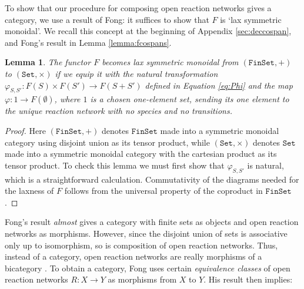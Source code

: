 \documentclass{compositionalityarticle}
\newcommand{\FinSet}{\mathtt{FinSet}}
\newcommand{\Set}{\mathtt{Set}}
\newcommand{\maps}{\colon}
\theoremstyle{plain}
\newtheorem{lem}[thm]{Lemma}
\theoremstyle{remark}
\begin{document}
To show that our procedure for composing open reaction networks gives a category, we use a result of Fong: it suffices to show that $F$ is `lax symmetric monoidal'.  We recall this concept at the beginning of Appendix \ref{sec:deccospan}, and Fong's result in Lemma \ref{lemma:fcospans}.

\begin{lem}
\label{lemma:RLax}
The functor $F$ becomes lax symmetric monoidal from $(\FinSet, +)$ to $(\Set, \times)$ if we equip it with the natural transformation $\varphi_{S,S'} \maps F(S) \times F(S') \to F(S + S')$ defined in Equation \eqref{eq:Phi} and the map $\varphi \maps 1 \to F(\emptyset)$, where $1$ is a chosen one-element set, sending its one element to the unique reaction network with no species and no transitions.
\end{lem}

\begin{proof}
Here $(\FinSet, +)$ denotes $\FinSet$ made into a symmetric monoidal category using  disjoint union as its tensor product, while  $(\Set, \times)$ denotes $\Set$ made into a symmetric monoidal category with the cartesian product as its tensor product.  
To check this lemma we must first show that $\varphi_{S,S'}$ is natural, which is a straightforward calculation.  Commutativity of the diagrams needed for the laxness of $F$ follows from the universal property of the coproduct in $\FinSet$.  \end{proof}

Fong's result \emph{almost} gives a category with finite sets as objects and open reaction networks as morphisms.  However, since the disjoint union of sets is associative only up to isomorphism, so is composition of open reaction networks.   Thus, instead of a category, open reaction networks are really morphisms of a bicategory \cite{Courser}.   To obtain a category, Fong uses certain \emph{equivalence classes} of open reaction networks $R \maps X \to Y$ as morphisms from $X$ to $Y$.  His result then implies:
\end{document}
